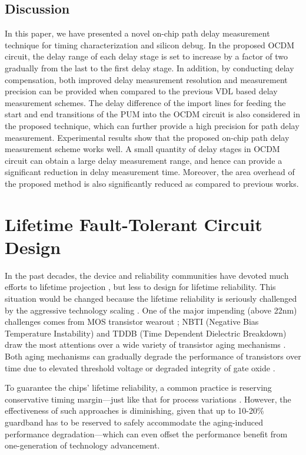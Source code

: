 \subsection{Discussion}
In this paper, we have presented a novel on-chip path delay measurement technique for timing characterization and silicon debug. In the proposed OCDM circuit, the delay range of each delay stage is set to increase by a factor of two gradually from the last to the first delay stage. In addition, by conducting delay compensation, both improved delay measurement resolution and measurement precision can be provided when compared to the previous VDL based delay measurement schemes. The delay difference of the import lines for feeding the start and end transitions of the PUM into the OCDM circuit is also considered in the proposed technique, which can further provide a high precision for path delay measurement. Experimental results show that the proposed on-chip path delay measurement scheme works well. A small quantity of delay stages in OCDM circuit can obtain a large delay measurement range, and hence can provide a significant reduction in delay measurement time. Moreover, the area overhead of the proposed method is also significantly reduced as compared to previous works.

\section{Lifetime Fault-Tolerant Circuit Design}
In the past decades, the device and reliability communities have devoted much efforts to lifetime projection \cite{Sony}\cite{Atmel}, but less to design for lifetime reliability. This situation would be changed because the lifetime reliability is seriously challenged by the aggressive technology scaling \cite{degradation_05}\cite{ITRS_PIDS07}. One of the major impending (above 22nm) challenges comes from MOS transistor wearout \cite{ITRS_PIDS07}; NBTI (Negative Bias Temperature Instability)  and TDDB (Time Dependent Dielectric Breakdown) draw the most attentions over a wide variety of transistor aging mechanisms \cite{ITRS_PIDS07}. Both aging mechanisms can gradually degrade the performance of transistors over time \cite{failure_prediction_07}\cite{Self-calibrating_07} due to elevated threshold voltage \cite{NBTI_Impact05}\cite{Impact-of-NBTI_07} or degraded integrity of gate oxide \cite{OB_Invert_03}\cite{Impact_BD_04}\cite{Gate-oxide-breakdown-07}.

To guarantee the chips' lifetime reliability, a common practice is reserving conservative timing margin---just like that for process variations \cite{ParameterVariations_DAC03}. However, the effectiveness of such approaches is diminishing, given that up to 10-20\% guardband has to be reserved to safely accommodate the aging-induced performance degradation---which can even offset the performance benefit from one-generation of technology advancement.

